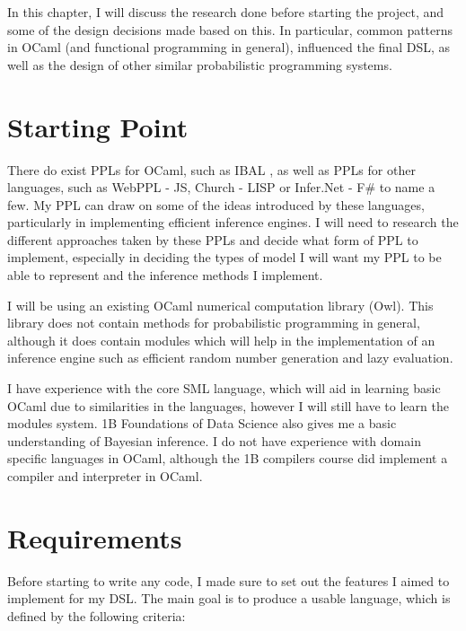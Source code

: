 
In this chapter, I will discuss the research done before starting the project, and some of the design decisions made based on this. In particular, common patterns in OCaml (and functional programming in general), influenced the final DSL, as well as the design of other similar probabilistic programming systems.

\section{Starting Point}

There do exist PPLs for OCaml, such as IBAL \cite{kiselyov2009embedded}, as well as PPLs for other languages, such as WebPPL - JS\cite{mobus2018structure}, Church - LISP\cite{goodman2012church} or Infer.Net - F\#\cite{wang2011using} to name a few. My PPL can draw on some of the ideas introduced by these languages, particularly in implementing efficient inference engines. I will need to research the different approaches taken by these PPLs and decide what form of PPL to implement, especially in deciding the types of model I will want my PPL to be able to represent and the inference methods I implement.

I will be using an existing OCaml numerical computation library (Owl). This library does not contain methods for probabilistic programming in general, although it does contain modules which will help in the implementation of an inference engine such as efficient random number generation and lazy evaluation.

I have experience with the core SML language, which will aid in learning basic OCaml due to similarities in the languages, however I will still have to learn the modules system. 1B Foundations of Data Science also gives me a basic understanding of Bayesian inference. I do not have experience with domain specific languages in OCaml, although the 1B compilers course did implement a compiler and interpreter in OCaml.

\section{Requirements}

Before starting to write any code, I made sure to set out the features I aimed to implement for my DSL. The main goal is to produce a usable language, which is defined by the following criteria:

